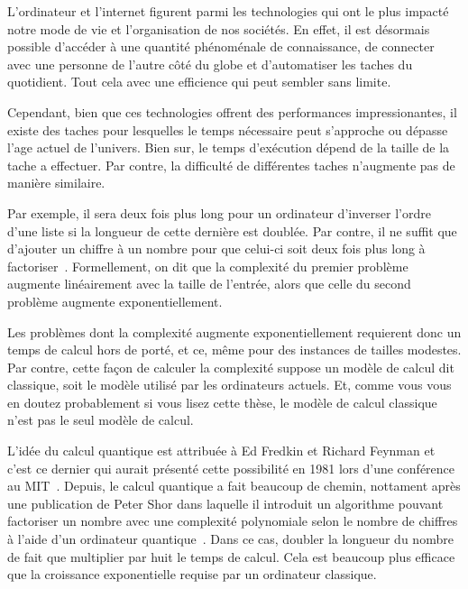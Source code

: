 \Introduction   %

L'ordinateur et l'internet figurent parmi les technologies qui ont le plus impacté
notre mode de vie et l'organisation de nos sociétés.
En effet,
il est désormais possible d'accéder à une quantité phénoménale de connaissance,
de connecter avec une personne de l'autre côté du globe
et d'automatiser les taches du quotidient.
Tout cela avec une efficience qui peut sembler sans limite.

Cependant, 
bien que ces technologies offrent des performances impressionantes,
il existe des taches pour lesquelles le temps nécessaire peut s'approche ou
dépasse l'age actuel de l'univers.
Bien sur,
le temps d'exécution dépend de la taille de la tache a effectuer.
Par contre, 
la difficulté de différentes taches n'augmente pas de manière similaire.

Par exemple,
il sera deux fois plus long pour un ordinateur d'inverser l'ordre d'une liste 
si la longueur de cette dernière est doublée.
Par contre,
il ne suffit que d'ajouter un chiffre à un nombre pour que celui-ci soit deux 
fois plus long à factoriser~\cite{arora_computational_2009}.
Formellement,
on dit que la complexité du premier problème augmente linéairement avec la taille de l'entrée,
alors que celle du second problème augmente exponentiellement.

Les problèmes dont la complexité augmente exponentiellement requierent donc un temps de calcul
hors de porté, et ce, même pour des instances de tailles modestes.
Par contre,
cette façon de calculer la complexité suppose un modèle de calcul dit classique,
soit le modèle utilisé par les ordinateurs actuels.
Et,
comme vous vous en doutez probablement si vous lisez cette thèse,
le modèle de calcul classique n'est pas le seul modèle de calcul.

L'idée du calcul quantique est attribuée à Ed Fredkin et Richard Feynman et 
c'est ce dernier qui aurait présenté cette possibilité en 1981 lors d'une conférence au MIT~\cite{hoofnagle_birth_2021}.
Depuis,
le calcul quantique a fait beaucoup de chemin,
nottament après une publication de Peter Shor dans laquelle il introduit un 
algorithme pouvant factoriser un nombre avec une complexité polynomiale selon
le nombre de chiffres à l'aide d'un ordinateur quantique~\cite{shor_algorithms_1994}.
Dans ce cas,
doubler la longueur du nombre de fait que multiplier par huit le temps de calcul.
Cela est beaucoup plus efficace que la croissance exponentielle requise par un ordinateur classique.

